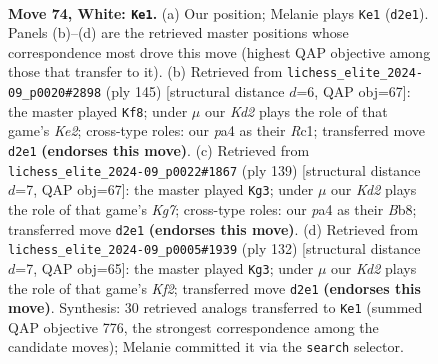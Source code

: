 \documentclass[11pt]{article}
\begin{document}
\clearpage

\begin{figure}[p]\centering
\begin{subfigure}{0.46\textwidth}\centering
\resizebox{\linewidth}{!}{%
\newchessgame
\chessboard[
  setfen={8/4k3/8/2pp4/p7/8/3K3r/8 w - - 4 74},
  showmover=false,
  pgfstyle=straightmove, color=movearrow, markmove={d2-e1}
]}
\caption{}
\end{subfigure}\hfill
\begin{subfigure}{0.46\textwidth}\centering
\resizebox{\linewidth}{!}{%
\newchessgame
\chessboard[
  setfen={8/R3k3/6K1/8/5P2/8/8/2r5 b - - 32 73},
  showmover=false,
  pgfstyle=straightmove, color=movearrow, markmove={e7-f8}
]}
\caption{}
\end{subfigure}
\\[4pt]
\begin{subfigure}{0.46\textwidth}\centering
\resizebox{\linewidth}{!}{%
\newchessgame
\chessboard[
  setfen={1b6/8/8/8/4K2p/1P6/2R3k1/8 b - - 35 70},
  showmover=false,
  pgfstyle=straightmove, color=movearrow, markmove={g2-g3}
]}
\caption{}
\end{subfigure}\hfill
\begin{subfigure}{0.46\textwidth}\centering
\resizebox{\linewidth}{!}{%
\newchessgame
\chessboard[
  setfen={8/6pk/8/8/6p1/8/1r3K2/8 w - - 8 67},
  showmover=false,
  pgfstyle=straightmove, color=movearrow, markmove={f2-g3}
]}
\caption{}
\end{subfigure}
\caption{\textbf{Move 74, White: \texttt{Ke1}.} (a) Our position; Melanie plays \texttt{Ke1} (\texttt{d2e1}). Panels (b)--(d) are the retrieved master positions whose correspondence most drove this move (highest QAP objective among those that transfer to it). (b) Retrieved from \texttt{lichess\_elite\_2024-09\_p0020\#2898} (ply 145) [structural distance $d$=6, QAP obj=67]: the master played \texttt{Kf8}; under $\mu$ our \emph{Kd2} plays the role of that game's \emph{Ke2}; cross-type roles: our \emph{p}a4 as their \emph{R}c1; transferred move \texttt{d2e1} \textbf{(endorses this move)}. (c) Retrieved from \texttt{lichess\_elite\_2024-09\_p0022\#1867} (ply 139) [structural distance $d$=7, QAP obj=67]: the master played \texttt{Kg3}; under $\mu$ our \emph{Kd2} plays the role of that game's \emph{Kg7}; cross-type roles: our \emph{p}a4 as their \emph{B}b8; transferred move \texttt{d2e1} \textbf{(endorses this move)}. (d) Retrieved from \texttt{lichess\_elite\_2024-09\_p0005\#1939} (ply 132) [structural distance $d$=7, QAP obj=65]: the master played \texttt{Kg3}; under $\mu$ our \emph{Kd2} plays the role of that game's \emph{Kf2}; transferred move \texttt{d2e1} \textbf{(endorses this move)}. Synthesis: 30 retrieved analogs transferred to \texttt{Ke1} (summed QAP objective 776, the strongest correspondence among the candidate moves); Melanie committed it via the \texttt{search} selector.}
\label{fig:thought-m146}
\end{figure}
\end{document}
